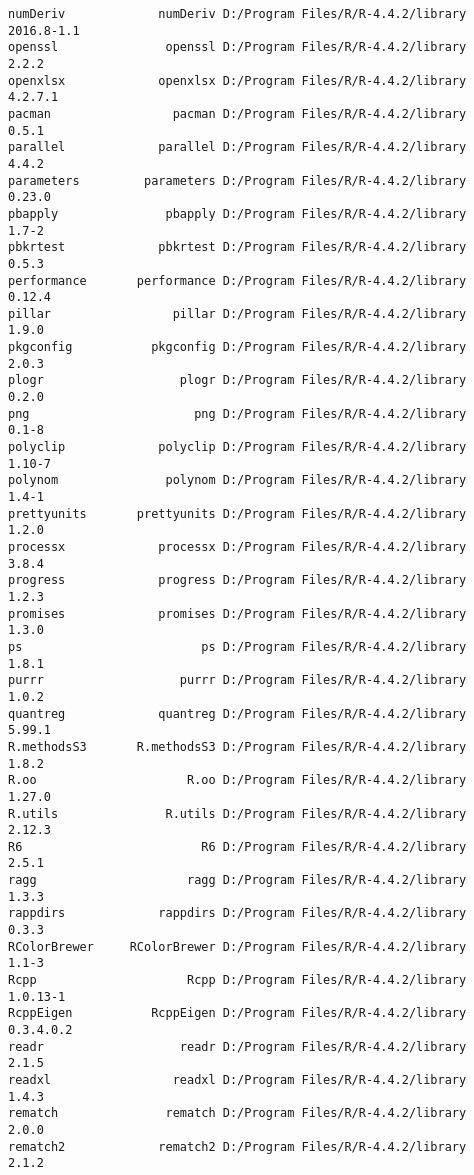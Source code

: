 \documentclass[
  letterpaper,
  DIV=11,
  numbers=noendperiod]{scrreprt}
\begin{document}
\begin{verbatim}
numDeriv             numDeriv D:/Program Files/R/R-4.4.2/library 2016.8-1.1
openssl               openssl D:/Program Files/R/R-4.4.2/library      2.2.2
openxlsx             openxlsx D:/Program Files/R/R-4.4.2/library    4.2.7.1
pacman                 pacman D:/Program Files/R/R-4.4.2/library      0.5.1
parallel             parallel D:/Program Files/R/R-4.4.2/library      4.4.2
parameters         parameters D:/Program Files/R/R-4.4.2/library     0.23.0
pbapply               pbapply D:/Program Files/R/R-4.4.2/library      1.7-2
pbkrtest             pbkrtest D:/Program Files/R/R-4.4.2/library      0.5.3
performance       performance D:/Program Files/R/R-4.4.2/library     0.12.4
pillar                 pillar D:/Program Files/R/R-4.4.2/library      1.9.0
pkgconfig           pkgconfig D:/Program Files/R/R-4.4.2/library      2.0.3
plogr                   plogr D:/Program Files/R/R-4.4.2/library      0.2.0
png                       png D:/Program Files/R/R-4.4.2/library      0.1-8
polyclip             polyclip D:/Program Files/R/R-4.4.2/library     1.10-7
polynom               polynom D:/Program Files/R/R-4.4.2/library      1.4-1
prettyunits       prettyunits D:/Program Files/R/R-4.4.2/library      1.2.0
processx             processx D:/Program Files/R/R-4.4.2/library      3.8.4
progress             progress D:/Program Files/R/R-4.4.2/library      1.2.3
promises             promises D:/Program Files/R/R-4.4.2/library      1.3.0
ps                         ps D:/Program Files/R/R-4.4.2/library      1.8.1
purrr                   purrr D:/Program Files/R/R-4.4.2/library      1.0.2
quantreg             quantreg D:/Program Files/R/R-4.4.2/library     5.99.1
R.methodsS3       R.methodsS3 D:/Program Files/R/R-4.4.2/library      1.8.2
R.oo                     R.oo D:/Program Files/R/R-4.4.2/library     1.27.0
R.utils               R.utils D:/Program Files/R/R-4.4.2/library     2.12.3
R6                         R6 D:/Program Files/R/R-4.4.2/library      2.5.1
ragg                     ragg D:/Program Files/R/R-4.4.2/library      1.3.3
rappdirs             rappdirs D:/Program Files/R/R-4.4.2/library      0.3.3
RColorBrewer     RColorBrewer D:/Program Files/R/R-4.4.2/library      1.1-3
Rcpp                     Rcpp D:/Program Files/R/R-4.4.2/library   1.0.13-1
RcppEigen           RcppEigen D:/Program Files/R/R-4.4.2/library  0.3.4.0.2
readr                   readr D:/Program Files/R/R-4.4.2/library      2.1.5
readxl                 readxl D:/Program Files/R/R-4.4.2/library      1.4.3
rematch               rematch D:/Program Files/R/R-4.4.2/library      2.0.0
rematch2             rematch2 D:/Program Files/R/R-4.4.2/library      2.1.2

\end{verbatim}
\end{document}
